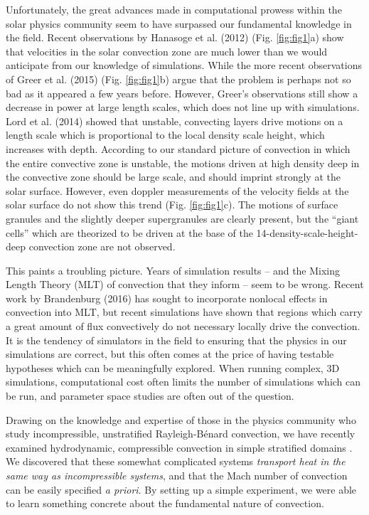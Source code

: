 \documentclass[aasms,12pt]{article}
\newcommand{\RB}{Rayleigh-B\'{e}nard }
\begin{document}
Unfortunately, the great advances made in computational prowess within the solar physics
community seem to have surpassed our fundamental knowledge in the field. Recent observations
by Hanasoge et al. (2012) \cite{hanasoge&all2012} (Fig. \ref{fig:fig1}a) show that 
velocities in the solar convection zone
are much lower than we would anticipate from our knowledge of simulations.  While the
more recent observations of Greer et al. (2015) \cite{greer&all2015} (Fig. \ref{fig:fig1}b) 
argue that the problem is perhaps not so bad
as it appeared a few years before.  However, Greer's observations still show a decrease in power at
large length scales, which does not line up with simulations.  Lord et al. (2014) \cite{lord&all2014} showed
that unstable, convecting layers drive motions on a length scale which is proportional to
the local density scale height, which increases with depth.  According to our standard picture of convection
in which the entire convective zone is unstable, the motions driven at high density deep in the convective
zone should be large scale, and should imprint strongly at the solar surface.
However, even doppler measurements of the velocity fields at the solar surface do not show this trend
\cite{hathaway&all2015}
(Fig. \ref{fig:fig1}c).  The motions of surface granules and the slightly deeper supergranules are
clearly present, but the
``giant cells'' which are theorized to be driven at the base of the 14-density-scale-height-deep
convection zone are not observed.

This paints a troubling picture.  Years of simulation results -- and the Mixing Length
Theory (MLT) of convection that they inform -- seem to be wrong.  Recent work by
Brandenburg (2016) \cite{brandenburg2016} has sought to incorporate nonlocal effects in
convection into MLT, but recent simulations \cite{kapyla&all2017} have shown that regions which
carry a great amount of flux convectively do not necessary locally drive the convection.
It is the tendency of simulators in the field to ensuring that the physics in our simulations are 
correct, but this often comes at the price of having testable hypotheses which can be meaningfully
explored. When running complex, 3D simulations, 
computational cost often limits the number of simulations which can be
run, and parameter space studies are often out of the question.  

Drawing on the knowledge and expertise of those in the physics community who study incompressible,
unstratified \RB convection, we have recently examined hydrodynamic, compressible convection
in simple stratified domains \cite{anders&brown2017}.  We discovered that these somewhat complicated systems
\emph{transport heat in the same way as incompressible systems}, and that the Mach number of
convection can be easily specified \emph{a priori}.  By setting up a simple experiment, we
were able to learn something concrete about the fundamental nature of convection.  
\end{document}
